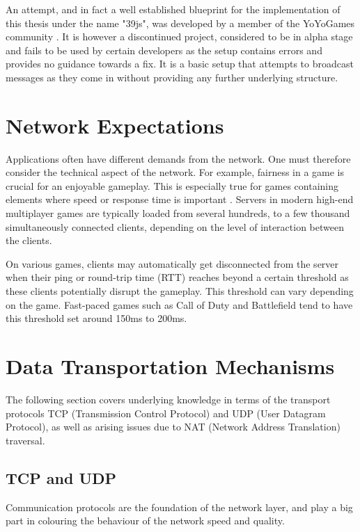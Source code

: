 \documentclass[bsc, 12pt, twoside, singlespacing, parskip, abbrevs, notimes, normalheadings, logo, deptreport]{styles/infthesis}
\begin{document}
An attempt, and in fact a well established blueprint for the implementation of this thesis under the name "39js", was developed by a member of the YoYoGames community \cite{gamemaker_networking_attempt}. It is however a discontinued project, considered to be in alpha stage and fails to be used by certain developers as the setup contains errors and provides no guidance towards a fix. It is a basic setup that attempts to broadcast messages as they come in without providing any further underlying structure.


\section{Network Expectations}
Applications often have different demands from the network. One must therefore consider the technical aspect of the network. For example, fairness in a game is crucial for an enjoyable gameplay. This is especially true for games containing elements where speed or response time is important \cite{Fairness_and_Playability}. Servers in modern high-end multiplayer games are typically loaded from several hundreds, to a few thousand simultaneously connected clients, depending on the level of interaction between the clients.

On various games, clients may automatically get disconnected from the server when their ping or round-trip time (RTT) reaches beyond a certain threshold as these clients potentially disrupt the gameplay. This threshold can vary depending on the game. Fast-paced games such as Call of Duty and Battlefield tend to have this threshold set around 150ms to 200ms.

\section{Data Transportation Mechanisms}
The following section covers underlying knowledge in terms of the transport protocols TCP (Transmission Control Protocol) and UDP (User Datagram Protocol), as well as arising issues due to NAT (Network Address Translation) traversal.

\subsection{TCP and UDP}
Communication protocols are the foundation of the network layer, and play a big part in colouring the behaviour of the network speed and quality.
\end{document}

